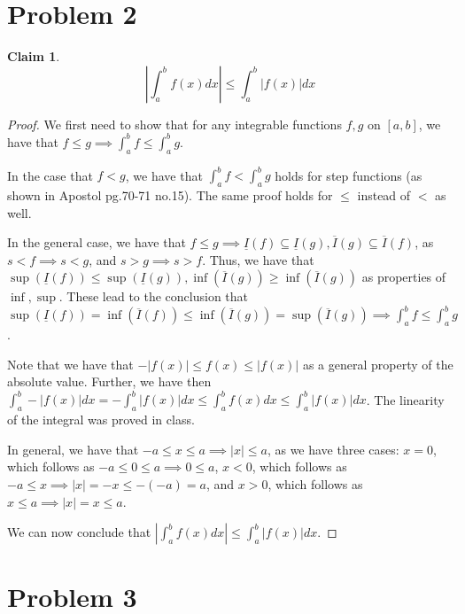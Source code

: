 \documentclass[12pt,letterpaper]{article}
\theoremstyle{definition}
\newtheorem*{claim}{Claim}
\begin{document}
\section*{Problem 2}

\begin{claim}
  $$ \left| \int_a^b f(x)dx \right| \leq \int_a^b|f(x)|dx$$
\end{claim}

\begin{proof}
  We first need to show that for any integrable functions $f,g$ on $[a,b]$, we
  have that $f \leq g \implies \int_a^b f \leq \int_a^b g$.

  In the case that $f < g$, we have that $\int_a^b f < \int_a^b g$ holds for
  step functions (as shown in Apostol pg.70-71 no.15). The same proof holds for
  $\leq$ instead of $<$ as well.

  In the general case, we have that $f \leq g \implies \underline{I}(f)
  \subseteq \underline{I}(g), \overline{I}(g) \subseteq \overline{I}(f)$, as $s
  < f \implies s < g$, and $s > g \implies s > f$. Thus, we have that
  $\sup(\underline{I}(f)) \leq \sup(\underline{I}(g)), \inf(\overline{I}(g))
  \geq \inf(\overline{I}(g))$ as properties of $\inf, \sup$. These lead to the
  conclusion that $\sup(\underline{I}(f)) = \inf(\overline{I}(f)) \leq
  \inf(\overline{I}(g)) = \sup(\overline{I}(g)) \implies \int_a^bf \leq \int_a^b
  g$.
  
  Note that we have that $-|f(x)| \leq f(x) \leq |f(x)|$ as a general property of the absolute
  value. Further, we have then $\int_a^b -|f(x)|dx = -\int_a^b|f(x)|dx \leq \int_a^bf(x)dx \leq \int_a^b |f(x)|dx$.
  The linearity of the integral was proved in class.

  In general, we have that $-a \leq x \leq a \implies |x| \leq a$, as we have
  three cases: $x = 0$, which follows as $-a \leq 0 \leq a \implies 0 \leq a$,
  $x < 0$, which follows as $-a \leq x \implies |x| = -x \leq -(-a) = a$, and $x
  > 0$, which follows as $x \leq a \implies |x| = x \leq a$. 
  
  We can now conclude that $|\int_a^bf(x)dx| \leq \int_a^b|f(x)|dx$.
\end{proof}

\section*{Problem 3}
\end{document}
